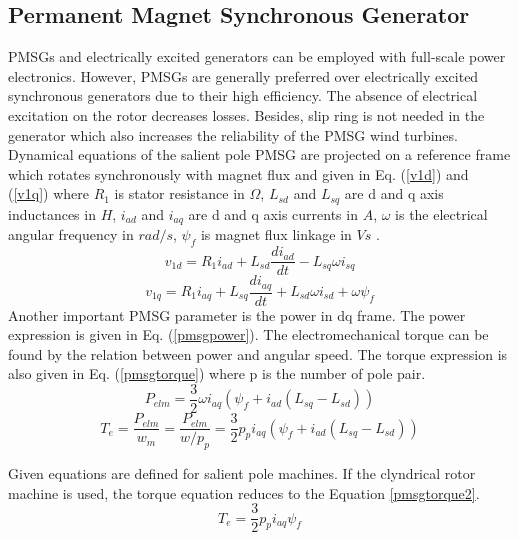 \subsection{Permanent Magnet Synchronous Generator}
\label{pmsgsection}
PMSGs and electrically excited generators can be employed with full-scale power electronics. However, PMSGs are generally preferred over electrically excited synchronous generators due to their high efficiency. The absence of electrical excitation on the rotor decreases losses. Besides, slip ring is not needed in the generator which also increases the reliability of the PMSG wind turbines. Dynamical equations of the salient pole PMSG are projected on a reference frame which rotates synchronously with magnet flux and given in Eq. (\ref{v1d}) and (\ref{v1q}) where $R_{1}$ is stator resistance in $\Omega$, $L_{sd}$ and $L_{sq}$ are d and q axis inductances in $H$, $i_{ad}$ and $i_{aq}$ are d and q axis currents in $A$, $\omega$ is the electrical angular frequency in $rad/s$, $\psi_{f}$ is magnet flux linkage in $Vs$ \cite{Ackermann2005a}. 
\begin{equation}
v_{1d}=R_{1} i_{ad}+L_{sd}\frac{di_{ad}}{dt}-L_{sq}\omega i_{sq}
\label{v1d}
\end{equation}
\begin{equation}
v_{1q}=R_{1} i_{aq}+L_{sq}\frac{di_{aq}}{dt}+L_{sd}\omega i_{sd}+\omega \psi_{f}
\label{v1q}
\end{equation}
Another important PMSG parameter is the power in dq frame. The power expression is given in Eq. (\ref{pmsgpower}). The electromechanical torque can be found by the relation between power and angular speed. The torque expression is also given in Eq. (\ref{pmsgtorque}) where p is the number of pole pair.
\begin{equation}
P_{elm}=\frac{3}{2}\omega i_{aq} (\psi_{f}+i_{ad}(L_{sq}-L_{sd}))
\label{pmsgpower}
\end{equation}
\begin{equation}
T_{e}=\frac{P_{elm}}{w_{m}}=\frac{P_{elm}}{w/p_{p}}=\frac{3}{2}p_{p} i_{aq} (\psi_{f}+i_{ad}(L_{sq}-L_{sd}))
\label{pmsgtorque}
\end{equation}

Given equations are defined for salient pole machines. If the clyndrical rotor machine is used, the torque equation reduces to the Equation \ref{pmsgtorque2}.
\begin{equation}
T_{e}=\frac{3}{2}p_{p} i_{aq} \psi_{f}
\label{pmsgtorque2}
\end{equation}
